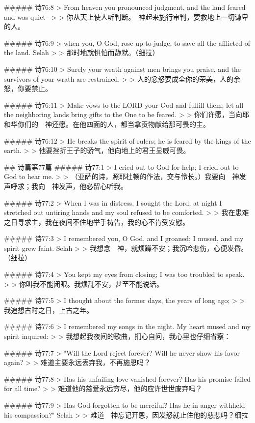 ##### 诗76:8
> From heaven you pronounced judgment, and the land feared and was quiet--
>
> 你从天上使人听判断。　神起来施行审判，要救地上一切谦卑的人。


##### 诗76:9
> when you, O God, rose up to judge, to save all the afflicted of the land. Selah
>
> 那时地就惧怕而静默。（细拉）


##### 诗76:10
> Surely your wrath against men brings you praise, and the survivors of your wrath are restrained.
>
> 人的忿怒要成全你的荣美，人的余怒，你要禁止。


##### 诗76:11
> Make vows to the LORD your God and fulfill them; let all the neighboring lands bring gifts to the One to be feared.
>
> 你们许愿，当向耶和华你们的　神还愿。在他四面的人，都当拿贡物献给那可畏的主。


##### 诗76:12
> He breaks the spirit of rulers; he is feared by the kings of the earth.
>
> 他要挫折王子的骄气，他向地上的君王显威可畏。


## 诗篇第77篇
##### 诗77:1
> I cried out to God for help; I cried out to God to hear me.
>
> （亚萨的诗，照耶杜顿的作法，交与伶长。）我要向　神发声呼求；我向　神发声，他必留心听我。


##### 诗77:2
> When I was in distress, I sought the Lord; at night I stretched out untiring hands and my soul refused to be comforted.
>
> 我在患难之日寻求主，我在夜间不住地举手祷告，我的心不肯受安慰。


##### 诗77:3
> I remembered you, O God, and I groaned; I mused, and my spirit grew faint. Selah
>
> 我想念　神，就烦躁不安；我沉吟悲伤，心便发昏。（细拉）


##### 诗77:4
> You kept my eyes from closing; I was too troubled to speak.
>
> 你叫我不能闭眼。我烦乱不安，甚至不能说话。


##### 诗77:5
> I thought about the former days, the years of long ago;
>
> 我追想古时之日，上古之年。


##### 诗77:6
> I remembered my songs in the night. My heart mused and my spirit inquired:
>
> 我想起我夜间的歌曲，扪心自问，我心里也仔细省察：


##### 诗77:7
> "Will the Lord reject forever? Will he never show his favor again?
>
> 难道主要永远丢弃我，不再施恩吗？


##### 诗77:8
> Has his unfailing love vanished forever? Has his promise failed for all time?
>
> 难道他的慈爱永远穷尽，他的应许世世废弃吗？


##### 诗77:9
> Has God forgotten to be merciful? Has he in anger withheld his compassion?" Selah
>
> 难道　神忘记开恩，因发怒就止住他的慈悲吗？细拉


